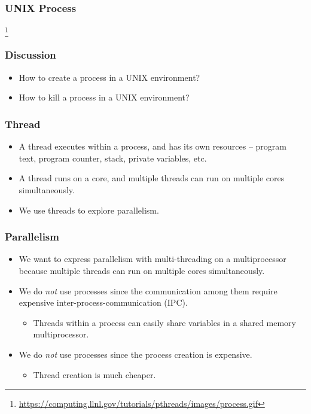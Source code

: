 \documentclass{beamer}
\begin{document}
\begin{frame}
\frametitle{UNIX Process}
\centerline{}
\footnote{\url{https://computing.llnl.gov/tutorials/pthreads/images/process.gif}}
\end{frame}

\begin{frame}
\frametitle{Discussion}
\begin{itemize}
\item How to create a process in a UNIX environment?
\item How to kill a process in a UNIX environment?
\end{itemize}
\end{frame}

\begin{frame}
\frametitle{Thread}
\begin{itemize}
\item A thread executes within a process, and has its own resources --
  program text, program counter, stack, private variables, etc.
\item A thread runs on a core, and multiple threads can run on
  multiple cores simultaneously.
\item We use threads to explore parallelism.
\end{itemize}
\end{frame}

\begin{frame}
\frametitle{Parallelism}
\begin{itemize}
\item We want to express parallelism with multi-threading on a
  multiprocessor because multiple threads can run on multiple cores
  simultaneously.
\item We do {\em not} use processes since the communication among them
  require expensive inter-process-communication (IPC).
\begin{itemize}
\item Threads within a process can easily share variables in a shared
  memory multiprocessor.
\end{itemize}
\item We do {\em not} use processes since the process creation is expensive.
\begin{itemize}
\item Thread creation is much cheaper.
\end{itemize}
\end{itemize}
\end{frame}
\end{document}
